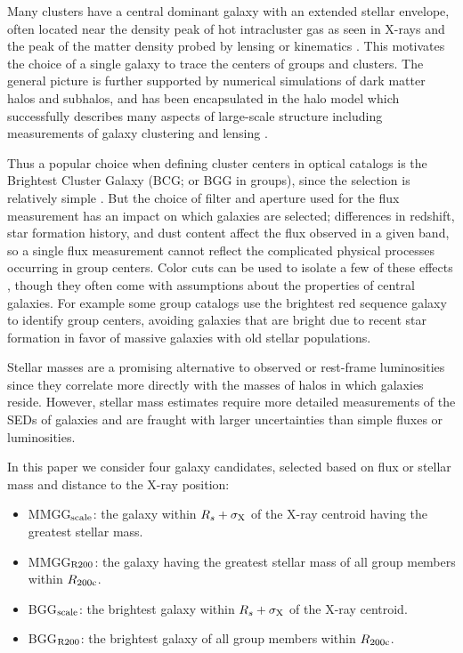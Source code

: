 \documentclass[12pt]{emulateapj}
\begin{document}
Many clusters have a central dominant galaxy with an extended stellar
envelope, often located near the density peak of hot intracluster gas
as seen in X-rays and the peak of the matter density probed by lensing
or kinematics \citep[e.g.,][and references therein]{Lin2004b}. This
motivates the choice of a single galaxy to trace the centers of groups
and clusters. The general picture is further supported by numerical
simulations of dark matter halos and subhalos, and has been
encapsulated in the halo model which successfully describes many
aspects of large-scale structure including measurements of galaxy
clustering and lensing \citep[e.g.,][]{Cooray2002, Zehavi2005,
  Mandelbaum2006a, Leauthaud2012}.

Thus a popular choice when defining cluster centers in optical catalogs is
the Brightest Cluster Galaxy (BCG; or BGG in groups), since the
selection is relatively simple 
\citep[e.g.,][]{Koester2007a, Hao2010}. But the choice of filter and
aperture used for the flux measurement has an impact on which galaxies
are selected; differences in redshift, star formation history, and
dust content affect the flux observed in a given band, so a single
flux measurement cannot reflect the complicated physical processes
occurring in group centers. Color cuts can be used to isolate a few of
these effects \citep[e.g.,][]{Gladders2000}, though they often come
with assumptions about the properties of central galaxies. For example
some group catalogs use the brightest red sequence galaxy to identify
group centers, avoiding galaxies that are bright due to recent star
formation in favor of massive galaxies with old stellar
populations. 

Stellar masses are a promising alternative to observed or
rest-frame luminosities since they correlate more directly with the
masses of halos in which galaxies reside. However, stellar mass
estimates require more detailed measurements of the SEDs of galaxies
and are fraught with larger uncertainties than simple fluxes or luminosities.

In this paper we consider four galaxy candidates, selected based on
flux or stellar mass and distance to the X-ray position:

\begin{itemize}
\item MMGG$_{\rm scale}$: the galaxy within $R_{s}+\sigma_{\rm X}$ of
  the X-ray centroid having the greatest stellar mass.
\item MMGG$_{\rm R200}$: the galaxy having the greatest stellar mass
  of all group members within $R_{\rm 200c}$.
\item BGG$_{\rm scale}$: the brightest galaxy within $R_{s}+\sigma_{\rm X}$ of
  the X-ray centroid.
\item BGG$_{\rm R200}$: the brightest galaxy of all group members
  within $R_{\rm 200c}$.
\end{itemize}
\end{document}
